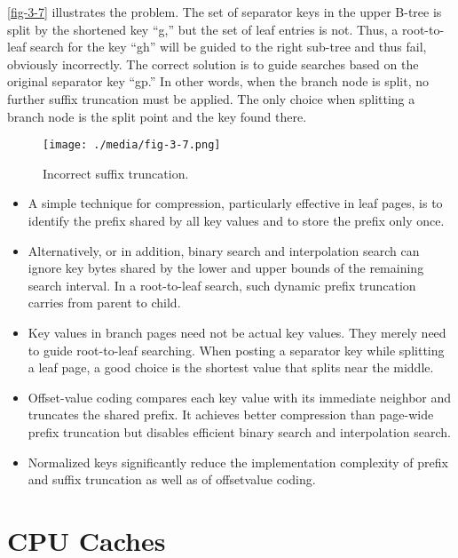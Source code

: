 \autoref{fig-3-7} illustrates the problem. The set of separator keys in the
upper B-tree is split by the shortened key ``g,'' but the set of leaf
entries is not. Thus, a root-to-leaf search for the key ``gh'' will be
guided to the right sub-tree and thus fail, obviously incorrectly. The
correct solution is to guide searches based on the original separator
key ``gp.'' In other words, when the branch node is split, no further
suffix truncation must be applied. The only choice when splitting a
branch node is the split point and the key found there.

\begin{figure}
  \centering
  \texttt{[image: ./media/fig-3-7.png]}

  \caption{Incorrect suffix truncation.\label{fig-3-7}}
\end{figure}

\begin{itemize}
\item
  A simple technique for compression, particularly effective in leaf
  pages, is to identify the prefix shared by all key values and to store
  the prefix only once.
\item
  Alternatively, or in addition, binary search and interpolation search
  can ignore key bytes shared by the lower and upper bounds of the
  remaining search interval. In a root-to-leaf search, such dynamic
  prefix truncation carries from parent to child.
\item
  Key values in branch pages need not be actual key values. They merely
  need to guide root-to-leaf searching. When posting a separator key
  while splitting a leaf page, a good choice is the shortest value that
  splits near the middle.
\item
  Offset-value coding compares each key value with its immediate
  neighbor and truncates the shared prefix. It achieves better
  compression than page-wide prefix truncation but disables efficient
  binary search and interpolation search.
\item
  Normalized keys significantly reduce the implementation complexity of
  prefix and suffix truncation as well as of offsetvalue coding.
\end{itemize}

\hypertarget{cpu-caches}{%
\section{CPU Caches}\label{cpu-caches}}

